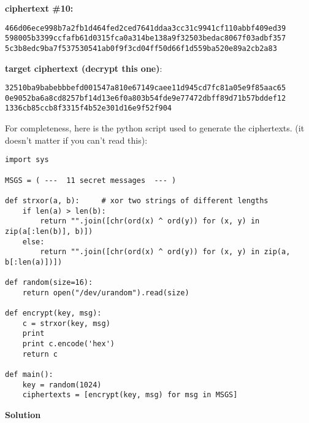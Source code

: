 \documentclass[a4paper,12pt]{article}
\begin{document}
\textbf{ciphertext \#10:}
\begin{verbatim}
466d06ece998b7a2fb1d464fed2ced7641ddaa3cc31c9941cf110abbf409ed39
598005b3399ccfafb61d0315fca0a314be138a9f32503bedac8067f03adbf357
5c3b8edc9ba7f537530541ab0f9f3cd04ff50d66f1d559ba520e89a2cb2a83
\end{verbatim}

\textbf{target ciphertext (decrypt this one)}:
\begin{verbatim}
32510ba9babebbbefd001547a810e67149caee11d945cd7fc81a05e9f85aac65
0e9052ba6a8cd8257bf14d13e6f0a803b54fde9e77472dbff89d71b57bddef12
1336cb85ccb8f3315f4b52e301d16e9f52f904
\end{verbatim}

For completeness, here is the python script used to generate the ciphertexts. (it doesn't matter if you can't read this):
%
\begin{verbatim}
import sys

MSGS = ( ---  11 secret messages  --- )

def strxor(a, b):     # xor two strings of different lengths
    if len(a) > len(b):
        return "".join([chr(ord(x) ^ ord(y)) for (x, y) in zip(a[:len(b)], b)])
    else:
        return "".join([chr(ord(x) ^ ord(y)) for (x, y) in zip(a, b[:len(a)])])

def random(size=16):
    return open("/dev/urandom").read(size)

def encrypt(key, msg):
    c = strxor(key, msg)
    print
    print c.encode('hex')
    return c

def main():
    key = random(1024)
    ciphertexts = [encrypt(key, msg) for msg in MSGS]  
\end{verbatim}

\textbf{Solution}\\
\end{document}
